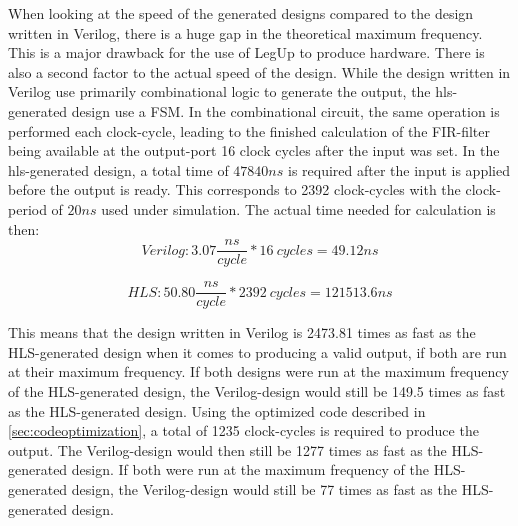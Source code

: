When looking at the speed of the generated designs compared to the design written in Verilog, there is a huge gap in the theoretical maximum frequency. This is a major drawback for the use of LegUp to produce hardware. There is also a second factor to the actual speed of the design. While the design written in Verilog use primarily combinational logic to generate the output, the \gls{hls}-generated design use a FSM. In the combinational circuit, the same operation is performed each clock-cycle, leading to the finished calculation of the FIR-filter being available at the output-port 16 clock cycles after the input was set. In the \gls{hls}-generated design, a total time of $47840ns$ is required after the input is applied before the output is ready. This corresponds to 2392 clock-cycles with the clock-period of $20ns$ used under simulation. The actual time needed for calculation is then:
\begin{equation*}
    Verilog: 3.07\frac{ns}{cycle}*16~cycles = 49.12ns
\end{equation*}

\begin{equation*}
    HLS: 50.80\frac{ns}{cycle}*2392~cycles = 121513.6ns
\end{equation*}

This means that the design written in Verilog is 2473.81 times as fast as the HLS-generated design when it comes to producing a valid output, if both are run at their maximum frequency. If both designs were run at the maximum frequency of the HLS-generated design, the Verilog-design would still be 149.5 times as fast as the HLS-generated design. Using the optimized code described in \cref{sec:codeoptimization}, a total of 1235 clock-cycles is required to produce the output. The Verilog-design would then still be 1277 times as fast as the HLS-generated design. If both were run at the maximum frequency of the HLS-generated design, the Verilog-design would still be 77 times as fast as the HLS-generated design.

